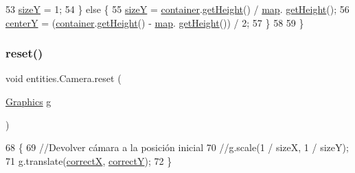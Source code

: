 \begin{DoxyCode}
53             \mbox{\hyperlink{classentities_1_1_camera_a57263eec54d4e2aaee3c60a9591182cf}{sizeY}} = 1;
54         \} \textcolor{keywordflow}{else} \{
55             \mbox{\hyperlink{classentities_1_1_camera_a57263eec54d4e2aaee3c60a9591182cf}{sizeY}} = \mbox{\hyperlink{classentities_1_1_camera_ab4ac985dbca326ba055c90fd80b1e1ad}{container}}.\mbox{\hyperlink{classorg_1_1newdawn_1_1slick_1_1_game_container_a7eff88473fe5715fdfc2f92e8cb48521}{getHeight}}() / \mbox{\hyperlink{classentities_1_1_camera_a33fca5e9de17b38aa1ddea3a75e89784}{map}}.
      \mbox{\hyperlink{classentities_1_1_map_a9ed9d1f8683c86dfca33639e252aaded}{getHeight}}();
56             \mbox{\hyperlink{classentities_1_1_camera_a67cda85f879ad07eb4884f58ec41e957}{centerY}} = (\mbox{\hyperlink{classentities_1_1_camera_ab4ac985dbca326ba055c90fd80b1e1ad}{container}}.\mbox{\hyperlink{classorg_1_1newdawn_1_1slick_1_1_game_container_a7eff88473fe5715fdfc2f92e8cb48521}{getHeight}}() - \mbox{\hyperlink{classentities_1_1_camera_a33fca5e9de17b38aa1ddea3a75e89784}{map}}.
      \mbox{\hyperlink{classentities_1_1_map_a9ed9d1f8683c86dfca33639e252aaded}{getHeight}}()) / 2;
57         \}
58 
59     \}
\end{DoxyCode}
\mbox{\label{classentities_1_1_camera_a89429480df11ec77d4b6e76672d77e96}} 
\subsubsection{\texorpdfstring{reset()}{reset()}}
{\footnotesize\ttfamily void entities.\+Camera.\+reset (\begin{DoxyParamCaption}\item[{\mbox{\hyperlink{classorg_1_1newdawn_1_1slick_1_1_graphics}{Graphics}}}]{g }\end{DoxyParamCaption})\hspace{0.3cm}{\ttfamily [inline]}}


\begin{DoxyCode}
68                                   \{
69         \textcolor{comment}{//Devolver cámara a la posición inicial}
70         \textcolor{comment}{//g.scale(1 / sizeX, 1 / sizeY);}
71         g.translate(\mbox{\hyperlink{classentities_1_1_camera_aff3fca00a4578d5a45ddb9c402d1bf0e}{correctX}}, \mbox{\hyperlink{classentities_1_1_camera_a4e9aeca687823695b7f8bd5842d063fc}{correctY}});
72     \}
\end{DoxyCode}
\mbox{\label{classentities_1_1_camera_aa751a4113be4d9302fafeb69ab6042d4}} 
